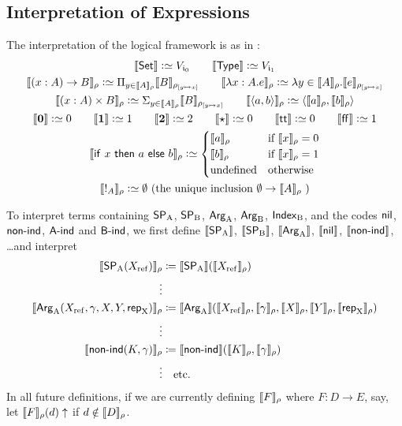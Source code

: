 \documentclass{schwicht}
\begin{document}
\subsection{Interpretation of Expressions}
\noindent 
The interpretation of the logical framework is as in
\cite{dybjersetzer1999finax}:
\begin{gather*}
\sem{\Set} \colonsimeq V_{\cardz} \qquad \sem{\TYPE} \colonsimeq V_{\cardi} \\
\sem{(x : A) \to B}_\rho \colonsimeq \Pi_{y \in
  \sem{A}_\rho}\sem{B}_{\rhoextend{y}{x}} \qquad
\sem{\lambda x:A.e}_\rho \colonsimeq \lambda y \in
\sem{A}_\rho.\sem{e}_{\rhoextend{y}{x}} \\
\sem{(x : A) \times B}_\rho \colonsimeq \Sigma_{y \in
  \sem{A}_\rho}\sem{B}_{\rhoextend{y}{x}} \qquad
\sem{\langle a, b \rangle}_\rho \colonsimeq \langle \sem{a}_\rho ,
\sem{b}_\rho\rangle \\
\sem{\zero} \colonsimeq 0 \qquad \sem{\one} \colonsimeq 1 \qquad
\sem{\two} \colonsimeq 2 \qquad \sem{\oneelt} \colonsimeq 0 \qquad \sem{\twott} \colonsimeq 0 \qquad
\sem{\twoff} \colonsimeq 1\\
\sem{\IF~x~\THEN~a~\ELSE~b}_\rho \colonsimeq
\begin{cases}
\sem{a}_\rho & \text{if $\sem{x}_\rho = 0$} \\
\sem{b}_\rho & \text{if $\sem{x}_\rho = 1$} \\
\text{undefined} & \text{otherwise} \\
\end{cases} \\
\sem{\magic{A}}_\rho \colonsimeq \emptyset \text{ (the unique inclusion $\emptyset \to \sem{A}_\rho$ )}
\end{gather*}

To interpret terms containing $\SPA$, $\SPB$, $\ArgA$, $\ArgB$,
$\IndexB$, and the codes $\nilA$, $\nonindA$, $\AindA$ and
$\BindA$, we first define $\sem{\SPA}$, $\sem{\SPB}$, $\sem{\ArgA}$,
$\sem{\nilA}$, $\sem{\nonindA}$, \ldots and interpret
{\allowdisplaybreaks
\begin{align*}
\sem{\SPA(\Xref)}_\rho &\coloneqq \sem{\SPA}(\sem{\Xref}_\rho) \\
\vdots \\
\sem{\ArgA(\Xref, \gamma, X, Y, \repA)}_\rho &\coloneqq
\sem{\ArgA}(\sem{\Xref}_\rho, \sem{\gamma}_\rho, \sem{X}_\rho, \sem{Y}_\rho, \sem{\repA}_\rho) \\
\vdots \\
\sem{\nonindA(K, \gamma)}_\rho &\coloneqq \sem{\nonindA}(\sem{K}_\rho,
\sem{\gamma}_\rho) \\
\vdots & \text{\quad etc.}
\end{align*}
In all future definitions, if we are currently defining $\sem{F}_{\rho}$ where $F : D
\to E$, say, let $\sem{F}_{\rho}(d)\uparrow$ if $d \notin \sem{D}_{\rho}$.
}
\end{document}
